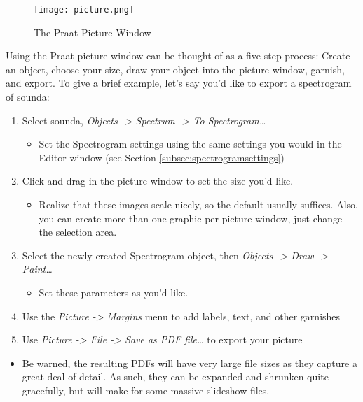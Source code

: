 \begin{figure}
  \centerline{
    \mbox{\texttt{[image: picture.png]}}
  }
  \caption{The Praat Picture Window \label{picture}}
  
  \end{figure}

Using the Praat picture window can be thought of as a five step process:
Create an object, choose your size, draw your object into the picture
window, garnish, and export. To give a brief example, let's say you'd
like to export a spectrogram of sounda:

\begin{enumerate}
\def\labelenumi{\arabic{enumi}.}
\tightlist
\item
  Select sounda, \emph{Objects -\textgreater{} Spectrum -\textgreater{}
  To Spectrogram\ldots{}}

  \begin{itemize}
  \tightlist
  \item
    Set the Spectrogram settings using the same settings you would in
    the Editor window (see Section \ref{subsec:spectrogramsettings})
  \end{itemize}
\item
  Click and drag in the picture window to set the size you'd like.

  \begin{itemize}
  \tightlist
  \item
    Realize that these images scale nicely, so the default usually
    suffices. Also, you can create more than one graphic per picture
    window, just change the selection area.
  \end{itemize}
\item
  Select the newly created Spectrogram object, then \emph{Objects
  -\textgreater{} Draw -\textgreater{} Paint\ldots{}}

  \begin{itemize}
  \tightlist
  \item
    Set these parameters as you'd like.
  \end{itemize}
\item
  Use the \emph{Picture -\textgreater{} Margins} menu to add labels,
  text, and other garnishes
\item
  Use \emph{Picture -\textgreater{} File -\textgreater{} Save as PDF
  file\ldots{}} to export your picture
\end{enumerate}

\begin{itemize}
\tightlist
\item
  Be warned, the resulting PDFs will have very large file sizes as they
  capture a great deal of detail. As such, they can be expanded and
  shrunken quite gracefully, but will make for some massive slideshow
  files.
\end{itemize}

